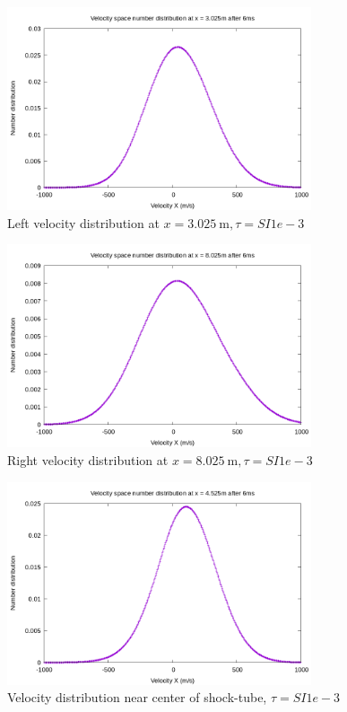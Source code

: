 \documentclass[paper=a4, fontsize=12pt]{scrartcl}
\begin{document}
\begin{figure}[H]
        \centering
        \includegraphics[width=0.8\textwidth]{left_f}
        \caption{Left velocity distribution at $x = \SI{3.025}{\meter}, \tau = SI{1e-3}{}$ }
        \label{fig:left_f}
\end{figure}
\begin{figure}[H]
        \centering
        \includegraphics[width=0.8\textwidth]{right_f}
        \caption{Right velocity distribution at $x = \SI{8.025}{\meter}, \tau = SI{1e-3}{}$ }
        \label{fig:right_f}
\end{figure}
\begin{figure}[H]
        \centering
        \includegraphics[width=0.8\textwidth]{center_shock}
        \caption{Velocity distribution near center of shock-tube, $\tau = SI{1e-3}{}$}
        \label{fig:center_shock}
\end{figure}
\end{document}
